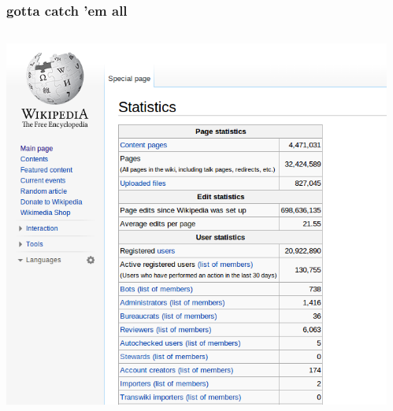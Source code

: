 \documentclass{beamer}
\begin{document}
\begin{frame}
  \frametitle{gotta catch 'em all}
  \begin{columns}
    \begin{column}{0.5\textwidth}
      \includegraphics[height = 0.8\textheight, width = \textwidth, keepaspectratio = true]{figure/wiki_stats}
    \end{column}
    \begin{column}{0.5\textwidth}

\end{column}
\end{columns}
\end{frame}
\end{document}
